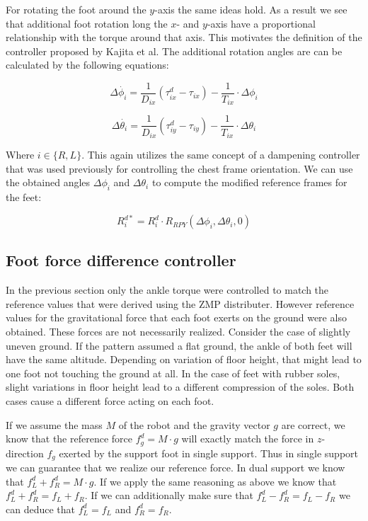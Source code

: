 \documentclass[english,ngerman]{KITreprt}
\begin{document}
For rotating the foot around the $y$-axis the same ideas hold. As a
result we see that additional foot rotation long the $x$- and $y$-axis
have a proportional relationship with the torque around that axis. This
motivates the definition of the controller proposed by Kajita et al. The
additional rotation angles are can be calculated by the following
equations:

\begin{equation}
\Delta \dot{\phi_i} = \frac{1}{D_{ix}} (\tau^d_{ix} - \tau_{ix}) - \frac{1}{T_{ix}} \cdot \Delta \phi_i
\end{equation}

\begin{equation}
\Delta \dot{\theta_i} = \frac{1}{D_{ix}} (\tau^d_{iy} - \tau_{iy}) - \frac{1}{T_{ix}} \cdot \Delta \theta_i
\end{equation}

Where $i \in \{R, L\}$. This again utilizes the same concept of a
dampening controller that was used previously for controlling the chest
frame orientation. We can use the obtained angles $\Delta \phi_i$ and
$\Delta \theta_i$ to compute the modified reference frames for the feet:

\begin{equation}
R^{d*}_i = R^d_i \cdot R_{RPY}(\Delta \phi_i, \Delta \theta_i, 0)
\end{equation}

\subsection{Foot force difference
controller}\label{foot-force-difference-controller}

In the previous section only the ankle torque were controlled to match
the reference values that were derived using the ZMP distributer.
However reference values for the gravitational force that each foot
exerts on the ground were also obtained. These forces are not
necessarily realized. Consider the case of slightly uneven ground. If
the pattern assumed a flat ground, the ankle of both feet will have the
same altitude. Depending on variation of floor height, that might lead
to one foot not touching the ground at all. In the case of feet with
rubber soles, slight variations in floor height lead to a different
compression of the soles. Both cases cause a different force acting on
each foot.

If we assume the mass $M$ of the robot and the gravity vector $g$ are
correct, we know that the reference force $f^d_g = M \cdot g$ will
exactly match the force in $z$-direction $f_g$ exerted by the support
foot in single support. Thus in single support we can guarantee that we
realize our reference force. In dual support we know that
$f^d_L + f^d_R = M \cdot g$. If we apply the same reasoning as above we
know that $f^d_L + f^d_R = f_L + f_R$. If we can additionally make sure
that $f^d_L - f^d_R = f_L - f_R$ we can deduce that $f^d_L = f_L$ and
$f^d_R = f_R$.
\end{document}
